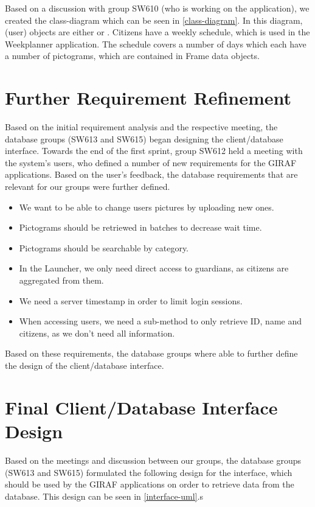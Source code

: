 Based on a discussion with group SW610 (who is working on the
 application), we created the class-diagram which can be seen
in \autoref{class-diagram}. In this diagram,  (user) objects are
either  or . Citizens have a weekly schedule,
which is used in the Weekplanner application. The schedule covers a number of
days which each have a number of pictograms, which are contained in Frame
data objects.


\section{Further Requirement Refinement}
Based on the initial requirement analysis and the respective meeting, the
database groups (SW613 and SW615) began designing the client/database interface.
Towards the end of the first sprint, group SW612 held a meeting with the
system's users, who defined a number of new requirements for the GIRAF
applications. Based on the user's feedback, the database requirements that are
relevant for our groups were further defined.

\begin{itemize}
  \item We want to be able to change users pictures by uploading new ones.
  \item Pictograms should be retriewed in batches to decrease wait time.
  \item Pictograms should be searchable by category.
  \item In the Launcher, we only need direct access to guardians, as citizens
  are aggregated from them.
  \item We need a server timestamp in order to limit login sessions.
  \item When accessing users, we need a sub-method to only retrieve ID, name and
  citizens, as we don't need all information.
\end{itemize}

Based on these requirements, the database groups where able to further define
the design of the client/database interface.

\section{Final Client/Database Interface Design}
Based on the meetings and discussion between our groups, the database groups
(SW613 and SW615) formulated the following design for the interface, which
should be used by the GIRAF applications on order to retrieve data from the
database. This design can be seen in \autoref{interface-uml}.s

